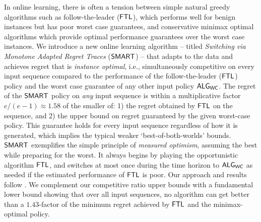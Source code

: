 In online learning, there is often a tension between simple natural greedy algorithms such as follow-the-leader ($\mathsf{FTL}$), which performs well for benign instances but has poor worst case guarantees, and conservative minimax optimal algorithms which provide optimal performance guarantees over the worst case instances. We introduce a new online learning algorithm -- titled \emph{Switching via Monotone Adapted Regret Traces} ($\mathsf{SMART}$) -- that adapts to the data and achieves regret that is \emph{instance optimal}, i.e., simultaneously competitive on every input sequence compared to the performance of the follow-the-leader ($\mathsf{FTL}$) policy and the worst case guarantee of any other input policy $\mathsf{ALG}_{\mathsf{WC}}$.  
The regret of the $\mathsf{SMART}$ policy on \emph{any} input sequence is within a multiplicative factor $e/(e-1) \approx 1.58$ of the smaller of: 1) the regret obtained by $\mathsf{FTL}$ on the sequence, and 2) the upper bound on regret guaranteed by the given worst-case policy. This guarantee holds for every input sequence regardless of how it is generated, which implies the typical weaker `best-of-both-worlds' bounds. $\mathsf{SMART}$ exemplifies the simple principle of {\em measured optimism}, assuming the best while preparing for the worst. It always begins by playing the opportunistic algorithm $\mathsf{FTL}$, and switches at most once during the time horizon to $\mathsf{ALG}_{\mathsf{WC}}$ as needed if the estimated performance of $\mathsf{FTL}$ is poor. Our approach and results follow . 
We complement our competitive ratio upper bounds with a fundamental lower bound showing that over all input sequences, no algorithm can get better than a $1.43$-factor of the minimum regret achieved by $\mathsf{FTL}$ and the minimax-optimal policy.



